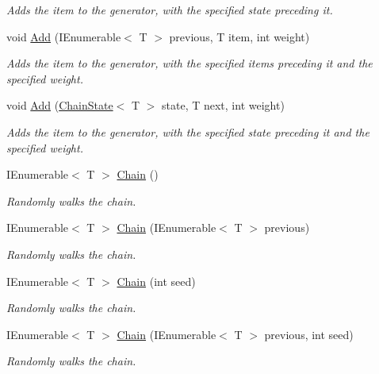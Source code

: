 \begin{DoxyCompactItemize}
\begin{DoxyCompactList}\small\item\em Adds the item to the generator, with the specified state preceding it. \end{DoxyCompactList}\item 
void \mbox{\hyperlink{class_markov_1_1_markov_chain_a3462f45546eaa3fd7c9592ca022a9ac6}{Add}} (I\+Enumerable$<$ T $>$ previous, T item, int weight)
\begin{DoxyCompactList}\small\item\em Adds the item to the generator, with the specified items preceding it and the specified weight. \end{DoxyCompactList}\item 
void \mbox{\hyperlink{class_markov_1_1_markov_chain_acbed62418075266c64c6e63d50726192}{Add}} (\mbox{\hyperlink{class_markov_1_1_chain_state}{Chain\+State}}$<$ T $>$ state, T next, int weight)
\begin{DoxyCompactList}\small\item\em Adds the item to the generator, with the specified state preceding it and the specified weight. \end{DoxyCompactList}\item 
I\+Enumerable$<$ T $>$ \mbox{\hyperlink{class_markov_1_1_markov_chain_a2748fc7f6e411bbbef965f4eaf7e5276}{Chain}} ()
\begin{DoxyCompactList}\small\item\em Randomly walks the chain. \end{DoxyCompactList}\item 
I\+Enumerable$<$ T $>$ \mbox{\hyperlink{class_markov_1_1_markov_chain_a2a851d551132a3c0b986ffdc435d94fa}{Chain}} (I\+Enumerable$<$ T $>$ previous)
\begin{DoxyCompactList}\small\item\em Randomly walks the chain. \end{DoxyCompactList}\item 
I\+Enumerable$<$ T $>$ \mbox{\hyperlink{class_markov_1_1_markov_chain_a4abb9314bca458994acd685a9357e1a0}{Chain}} (int seed)
\begin{DoxyCompactList}\small\item\em Randomly walks the chain. \end{DoxyCompactList}\item 
I\+Enumerable$<$ T $>$ \mbox{\hyperlink{class_markov_1_1_markov_chain_a325079fed5b93f2207814fa44a8108da}{Chain}} (I\+Enumerable$<$ T $>$ previous, int seed)
\begin{DoxyCompactList}\small\item\em Randomly walks the chain. \end{DoxyCompactList}\item 

\end{DoxyCompactItemize}
